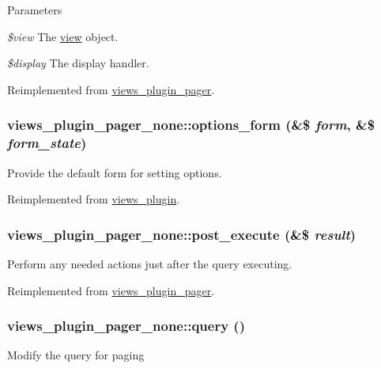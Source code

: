 \begin{DoxyParams}{Parameters}
\item[{\em \$view}]The \hyperlink{classview}{view} object. \item[{\em \$display}]The display handler. \end{DoxyParams}


Reimplemented from \hyperlink{classviews__plugin__pager_a3096789b9b8d3a912a6c5fb0ca8917a5}{views\_\-plugin\_\-pager}.\hypertarget{classviews__plugin__pager__none_adf238119a304288014fc66ae089a119a}{
\subsubsection[{options\_\-form}]{\setlength{\rightskip}{0pt plus 5cm}views\_\-plugin\_\-pager\_\-none::options\_\-form (\&\$ {\em form}, \/  \&\$ {\em form\_\-state})}}
\label{classviews__plugin__pager__none_adf238119a304288014fc66ae089a119a}
Provide the default form for setting options. 

Reimplemented from \hyperlink{classviews__plugin_a1aaed8da1afd9f45293a37358c159837}{views\_\-plugin}.\hypertarget{classviews__plugin__pager__none_a6edc35744edc03c632d74267a4d33ad3}{
\subsubsection[{post\_\-execute}]{\setlength{\rightskip}{0pt plus 5cm}views\_\-plugin\_\-pager\_\-none::post\_\-execute (\&\$ {\em result})}}
\label{classviews__plugin__pager__none_a6edc35744edc03c632d74267a4d33ad3}
Perform any needed actions just after the query executing. 

Reimplemented from \hyperlink{classviews__plugin__pager_a59687607f417ac6b3787ddb0ce71757c}{views\_\-plugin\_\-pager}.\hypertarget{classviews__plugin__pager__none_a16102d30cc1402cb7ed28fba9606cf81}{
\subsubsection[{query}]{\setlength{\rightskip}{0pt plus 5cm}views\_\-plugin\_\-pager\_\-none::query ()}}
\label{classviews__plugin__pager__none_a16102d30cc1402cb7ed28fba9606cf81}
Modify the query for paging

